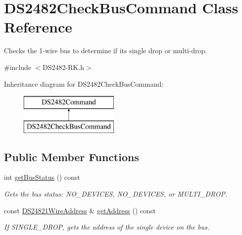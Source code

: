\hypertarget{class_d_s2482_check_bus_command}{}\section{D\+S2482\+Check\+Bus\+Command Class Reference}
\label{class_d_s2482_check_bus_command}


Checks the 1-\/wire bus to determine if it\textquotesingle{}s single drop or multi-\/drop.  




{\ttfamily \#include $<$D\+S2482-\/\+R\+K.\+h$>$}

Inheritance diagram for D\+S2482\+Check\+Bus\+Command\+:\begin{figure}[H]
\begin{center}
\leavevmode
\includegraphics[height=2.000000cm]{class_d_s2482_check_bus_command}
\end{center}
\end{figure}
\subsection*{Public Member Functions}
\begin{DoxyCompactItemize}
\item 
int \mbox{\hyperlink{class_d_s2482_check_bus_command_a2d374709f24c8d7ad0c48766d7f072ee}{get\+Bus\+Status}} () const
\begin{DoxyCompactList}\small\item\em Gets the bus status\+: N\+O\+\_\+\+D\+E\+V\+I\+C\+ES, N\+O\+\_\+\+D\+E\+V\+I\+C\+ES, or M\+U\+L\+T\+I\+\_\+\+D\+R\+OP. \end{DoxyCompactList}\item 
const \mbox{\hyperlink{class_d_s24821_wire_address}{D\+S24821\+Wire\+Address}} \& \mbox{\hyperlink{class_d_s2482_check_bus_command_ac768c4e5d7bae840e451323cabc3c2de}{get\+Address}} () const
\begin{DoxyCompactList}\small\item\em If S\+I\+N\+G\+L\+E\+\_\+\+D\+R\+OP, gets the address of the single device on the bus. \end{DoxyCompactList}\end{DoxyCompactItemize}
